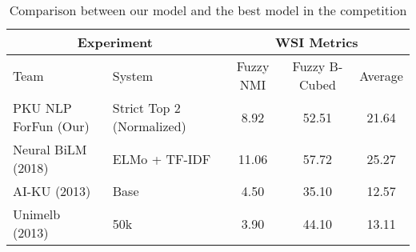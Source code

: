 \begin{table}[htbp!]
    \centering
    \begin{tabular}{llccc}
    \toprule
        \multicolumn{2}{c}{Experiment}                       & \multicolumn{3}{c}{WSI Metrics}           \\
    \midrule
        Team                    & System                     & Fuzzy NMI     & Fuzzy B-Cubed  & Average  \\
    \midrule
        PKU NLP ForFun (Our)    & Strict Top 2 (Normalized)  & 8.92          & 52.51          & 21.64    \\
        Neural BiLM (2018)      & ELMo + TF-IDF              & 11.06         & 57.72          & 25.27    \\
        AI-KU (2013)            & Base                       & 4.50          & 35.10          & 12.57    \\
        Unimelb (2013)          & 50k                        & 3.90          & 44.10          & 13.11    \\
    \bottomrule
    \end{tabular}
\caption{Comparison between our model and the best model in the competition}
\label{tab:best_result}
\end{table}
